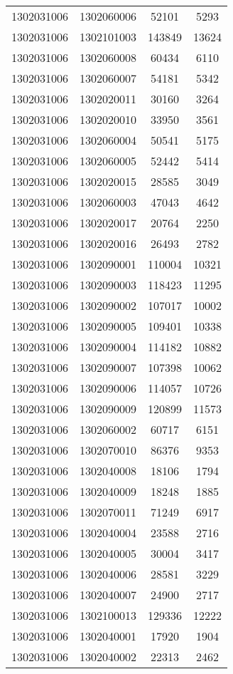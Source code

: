 \begin{longtable}[h]{llcc}
		1302031006 & 1302060006 & 52101 & 5293\\
		1302031006 & 1302101003 & 143849 & 13624\\
		1302031006 & 1302060008 & 60434 & 6110\\
		1302031006 & 1302060007 & 54181 & 5342\\
		1302031006 & 1302020011 & 30160 & 3264\\
		1302031006 & 1302020010 & 33950 & 3561\\
		1302031006 & 1302060004 & 50541 & 5175\\
		1302031006 & 1302060005 & 52442 & 5414\\
		1302031006 & 1302020015 & 28585 & 3049\\
		1302031006 & 1302060003 & 47043 & 4642\\
		1302031006 & 1302020017 & 20764 & 2250\\
		1302031006 & 1302020016 & 26493 & 2782\\
		1302031006 & 1302090001 & 110004 & 10321\\
		1302031006 & 1302090003 & 118423 & 11295\\
		1302031006 & 1302090002 & 107017 & 10002\\
		1302031006 & 1302090005 & 109401 & 10338\\
		1302031006 & 1302090004 & 114182 & 10882\\
		1302031006 & 1302090007 & 107398 & 10062\\
		1302031006 & 1302090006 & 114057 & 10726\\
		1302031006 & 1302090009 & 120899 & 11573\\
		1302031006 & 1302060002 & 60717 & 6151\\
		1302031006 & 1302070010 & 86376 & 9353\\
		1302031006 & 1302040008 & 18106 & 1794\\
		1302031006 & 1302040009 & 18248 & 1885\\
		1302031006 & 1302070011 & 71249 & 6917\\
		1302031006 & 1302040004 & 23588 & 2716\\
		1302031006 & 1302040005 & 30004 & 3417\\
		1302031006 & 1302040006 & 28581 & 3229\\
		1302031006 & 1302040007 & 24900 & 2717\\
		1302031006 & 1302100013 & 129336 & 12222\\
		1302031006 & 1302040001 & 17920 & 1904\\
		1302031006 & 1302040002 & 22313 & 2462\\

\end{longtable}
